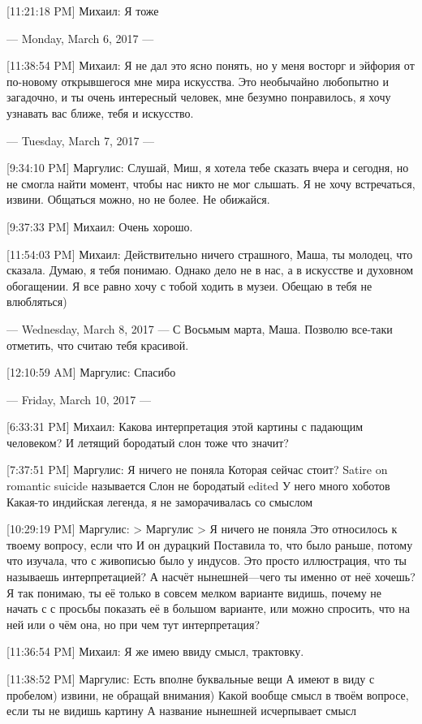 \documentclass{article}
\begin{document}
[11:21:18 PM] Михаил:
Я тоже

--- Monday, March 6, 2017 ---

[11:38:54 PM] Михаил:
Я не дал это ясно понять, но у меня восторг и эйфория от по-новому открывшегося мне мира искусства. Это необычайно любопытно и загадочно, и ты очень интересный человек, мне безумно понравилось, я хочу узнавать вас ближе, тебя и искусство.

--- Tuesday, March 7, 2017 ---

[9:34:10 PM] Маргулис:
Слушай, Миш, я хотела тебе сказать вчера и сегодня, но не смогла найти момент, чтобы нас никто не мог слышать. Я не хочу встречаться, извини. Общаться можно, но не более. Не обижайся.

[9:37:33 PM] Михаил:
Очень хорошо.

[11:54:03 PM] Михаил:
Действительно ничего страшного, Маша, ты молодец, что сказала. Думаю, я тебя понимаю. Однако дело не в нас, а в искусстве и духовном обогащении. Я все равно хочу с тобой ходить в музеи. Обещаю в тебя не влюбляться)

--- Wednesday, March 8, 2017 ---
 С Восьмым марта, Маша. Позволю все-таки отметить, что считаю тебя красивой.

[12:10:59 AM] Маргулис:
Спасибо

--- Friday, March 10, 2017 ---

[6:33:31 PM] Михаил:
Какова интерпретация этой картины с падающим человеком? И летящий бородатый слон тоже что значит?

[7:37:51 PM] Маргулис:
Я ничего не поняла
 Которая сейчас стоит?
 Satire on romantic suicide называется
 Слон не бородатый
edited 
У него много хоботов
 Какая-то индийская легенда, я не заморачивалась со смыслом

[10:29:19 PM] Маргулис:
> Маргулис
> Я ничего не поняла
Это относилось к твоему вопросу, если что
 И он дурацкий
 Поставила то, что было раньше, потому что изучала, что с живописью было у индусов. Это просто иллюстрация, что ты называешь интерпретацией? А насчёт нынешней—чего ты именно от неё хочешь? Я так понимаю, ты её только в совсем мелком варианте видишь, почему не начать с с просьбы показать её в большом варианте, или можно спросить, что на ней или о чём она, но при чем тут интерпретация?

[11:36:54 PM] Михаил:
Я же имею ввиду смысл, трактовку.

[11:38:52 PM] Маргулис:
Есть вполне буквальные вещи
 А имеют в виду с пробелом) извини, не обращай внимания)
 Какой вообще смысл в твоём вопросе, если ты не видишь картину
 А название нынешней исчерпывает смысл
\end{document}

